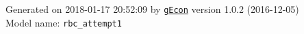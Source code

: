 \documentclass[10pt,a4paper]{article}
\numberwithin{equation}{section}
\begin{document}
\begin{flushleft}{\large
Generated  on 2018-01-17 20:52:09 by \href{http://gecon.r-forge.r-project.org/}{\texttt{gEcon}} version 1.0.2 (2016-12-05)\\
Model name: \verb+rbc_attempt1+
}\end{flushleft}



\end{document}
